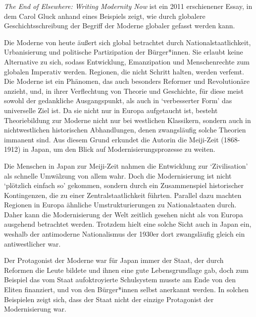 \documentclass[a4paper, 12pt]{article}
\begin{document}
\begin{onehalfspace} 





\noindent 
\emph{The End of Elsewhere: Writing Modernity Now} ist ein 2011 erschienener Essay, in dem Carol Gluck anhand eines Beispiels zeigt, wie durch globalere Geschichtsschreibung der Begriff der Moderne globaler gefasst werden kann.

Die Moderne von heute äußert sich global betrachtet durch Nationalstaatlichkeit, Urbanisierung und politische Partizipation der Bürger*innen. Sie erlaubt keine Alternative zu sich, sodass Entwicklung, Emanzipation und Menschenrechte zum globalen Imperativ werden. Regionen, die nicht Schritt halten, werden verfemt. Die Moderne ist ein Phänomen, das auch besonders Reformer und Revolutionäre anzieht, und, in ihrer Verflechtung von Theorie und Geschichte, für diese meist sowohl der gedankliche Ausgangspunkt, als auch in `verbesserter Form' das universelle Ziel ist. Da sie nicht nur in Europa aufgetaucht ist, besteht Theoriebildung zur Moderne nicht nur bei westlichen Klassikern, sondern auch in nichtwestlichen historischen Abhandlungen, denen zwangsläufig solche Theorien immanent sind. Aus diesem Grund erkundet die Autorin die Meiji-Zeit (1868-1912) in Japan, um den Blick auf Modernisierungsprozesse zu weiten.

Die Menschen in Japan zur Meiji-Zeit nahmen die Entwicklung zur `Zivilisation' als schnelle Umwälzung von allem wahr. Doch die Modernisierung ist nicht `plötzlich einfach so' gekommen, sondern durch ein Zusammenspiel historischer Kontingenzen, die zu einer Zentralstaatlichkeit führten. Parallel dazu machten Regionen in Europa ähnliche Umstrukturierungen zu Nationalstaaten durch. Daher kann die Modernisierung der Welt zeitlich gesehen nicht als von Europa ausgehend betrachtet werden. Trotzdem hielt eine solche Sicht auch in Japan ein, weshalb der antimoderne Nationalismus der 1930er dort zwangsläufig gleich ein antiwestlicher war.

Der Protagonist der Moderne war für Japan immer der Staat, der durch Reformen die Leute bildete und ihnen eine gute Lebensgrundlage gab, doch zum Beispiel das vom Staat aufoktroyierte Schulsystem musste am Ende von den Eliten finanziert, und von den Bürger*innen selbst anerkannt werden. In solchen Beispielen zeigt sich, dass der Staat nicht der einzige Protagonist der Modernisierung war.


\end{onehalfspace}
\end{document}
